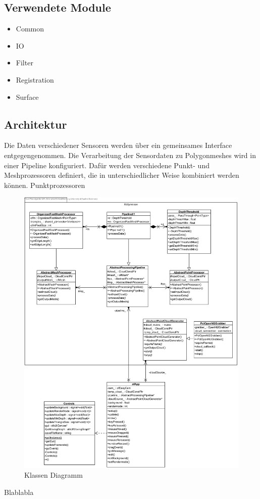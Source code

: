 \subsection{Verwendete Module}
\begin{itemize}
	\item Common
	\item IO
	\item Filter
	\item Registration
	\item Surface
\end{itemize}

\subsection{Architektur}
Die Daten verschiedener Sensoren werden über ein gemeinsames Interface entgegengenommen. 
Die Verarbeitung der Sensordaten zu Polygonmeshes wird in einer Pipeline konfiguriert. Dafür werden verschiedene Punkt- und Meshprozessoren definiert, die in unterschiedlicher Weise kombiniert werden können. Punktprozessoren

\onecolumn

\begin{figure}[h!]
	\begin{center}		
		\includegraphics[width=.9\textwidth, keepaspectratio]{img/class_diagram}
		\caption{Klassen Diagramm}
	\end{center}
\end{figure}

\twocolumn

Blablabla

